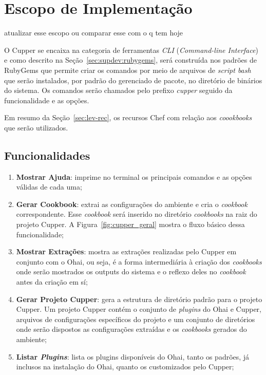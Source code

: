 \section{Escopo de Implementação}
\label{sec:escopo}

{\color{red} atualizar esse escopo ou comparar esse com o q tem hoje}

O Cupper se encaixa na categoria de ferramentas \textit{CLI} (\textit{Command-line Interface})
e como descrito na Seção~\ref{sec:supdev:rubygems}, será construída nos padrões de
RubyGems que permite criar os comandos por meio de arquivos de \textit{script bash}
que serão instalados, por padrão do gerenciado de pacote, no diretório de binários do sistema.
Os comandos serão chamados pelo prefixo \textit{cupper} seguido da funcionalidade e as opções.


Em resumo da Seção~\ref{sec:lev-rec}, os recursos Chef com relação aos \textit{coookbooks} que serão utilizados.

\subsection{Funcionalidades}

\begin{enumerate}
  \item \textbf{Mostrar Ajuda}: imprime no terminal os principais comandos e as opções válidas de
    cada uma;

  \item \textbf{Gerar Cookbook}: extrai as configurações do ambiente e cria o \textit{cookbook} correspondente.
    Esse \textit{cookbook} será inserido no diretório \textit{cookbooks} na raiz do projeto Cupper.
    A Figura~\ref{fig:cupper_geral} mostra o fluxo básico dessa funcionalidade;

  \item \textbf{Mostrar Extrações}: mostra as extrações realizadas pelo Cupper em conjunto com o Ohai,
    ou seja, é a forma intermediária à criação dos \textit{cookbooks} onde serão mostrados os outputs do
    sistema e o reflexo deles no \textit{cookbook} antes da criação em sí;

  \item \textbf{Gerar Projeto Cupper}: gera a estrutura de diretório padrão para o projeto Cupper.
    Um projeto Cupper contém o conjunto de \textit{plugins} do Ohai e Cupper, arquivos de configurações
    específicos do projeto e um conjunto de diretórios onde serão dispostos as configurações
    extraídas e os \textit{cookbooks} gerados do ambiente;

  \item \textbf{Listar \textit{Plugins}}: lista os plugins disponíveis do Ohai, tanto os padrões, já inclusos
    na instalação do Ohai, quanto os customizados pelo Cupper;

\end{enumerate}

